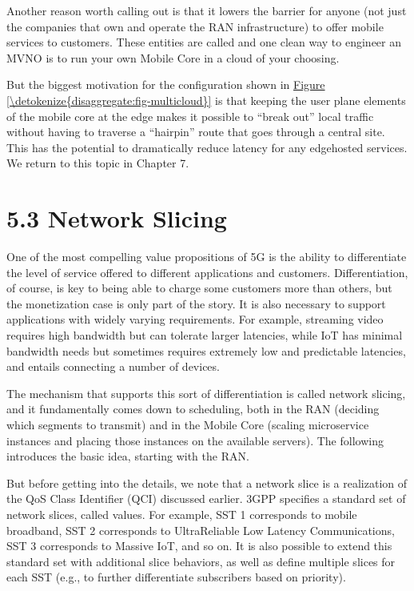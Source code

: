 \documentclass[a4paper,11pt,english]{sphinxmanual}
\begin{document}
\sphinxAtStartPar
Another reason worth calling out is that it lowers the barrier for
anyone (not just the companies that own and operate the RAN
infrastructure) to offer mobile services to customers. These entities
are called  and one clean
way to engineer an MVNO is to run your own Mobile Core in a cloud of
your choosing.

\sphinxAtStartPar
But the biggest motivation for the configuration shown in
\hyperref[\detokenize{disaggregate:fig-multicloud}]{Figure \ref{\detokenize{disaggregate:fig-multicloud}}} is that keeping the user plane
elements of the mobile core at the edge makes it possible to “break
out” local traffic without having to traverse a “hairpin” route that
goes through a central site. This has the potential to dramatically
reduce latency for any edge\sphinxhyphen{}hosted services. We return to this topic
in Chapter 7.


\section{5.3 Network Slicing}
\label{\detokenize{disaggregate:network-slicing}}
\sphinxAtStartPar
One of the most compelling value propositions of 5G is the ability to
differentiate the level of service offered to different applications
and customers. Differentiation, of course, is key to being able to
charge some customers more than others, but the monetization case
is only part of the story. It is also necessary to support
applications with widely varying requirements. For example, streaming video requires high bandwidth
but can tolerate larger latencies, while IoT has
minimal bandwidth needs but sometimes requires extremely low and predictable
latencies, and entails connecting a  number of
devices.

\sphinxAtStartPar
The mechanism that supports this sort of differentiation is called
network slicing, and it fundamentally comes down to scheduling, both in
the RAN (deciding which segments to transmit) and in the Mobile Core
(scaling microservice instances and placing those instances on the
available servers). The following introduces the basic idea, starting
with the RAN.

\sphinxAtStartPar
But before getting into the details, we note that a network slice is a
realization of the QoS Class Identifier (QCI) discussed earlier. 3GPP
specifies a standard set of network slices, called  values. For example, SST 1 corresponds to mobile broadband,
SST 2 corresponds to Ultra\sphinxhyphen{}Reliable Low Latency Communications, SST 3
corresponds to Massive IoT, and so on. It is also possible to extend
this standard set with additional slice behaviors, as well as define
multiple slices for each SST (e.g., to further differentiate subscribers
based on priority).
\end{document}
